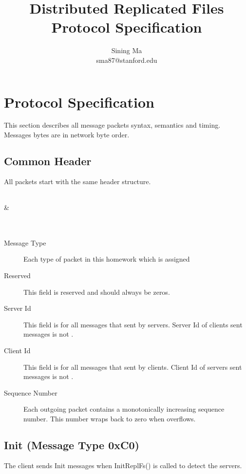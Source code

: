 \documentclass[12pt,fleqn]{article}
\begin{document}
\title{Distributed Replicated Files Protocol Specification}
\author{Sining Ma \\ sma87@stanford.edu}

\maketitle

\section{Protocol Specification}
This section describes all message packets syntax, semantics and timing. Messages bytes are in network byte order. 

\subsection{Common Header}
All packets start with the same header structure.

\begin{center}
	\begin{bytefield}[bitwidth=1.1em]{16}
		 \\
		 &  \\
		 \\
		 \\
	\end{bytefield}
\end{center}

\begin{description}
	\item[Message Type] Each type of packet in this homework which is assigned 
	\item[Reserved] This field is reserved and should always be zeros.
	\item[Server Id] This field is for all messages that sent by servers. Server Id of clients sent messages is not . 
	\item[Client Id] This field is for all messages that sent by clients. Client Id of servers sent messages is not .
	\item[Sequence Number] Each outgoing packet contains a monotonically increasing sequence number. This number wraps back to zero when overflows.
\end{description}

\subsection{Init (Message Type 0xC0)}
The client sends Init messages when InitReplFs() is called to detect the servers.
\end{document}
